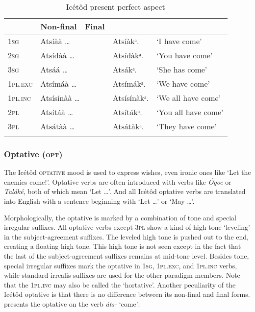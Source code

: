 \begin{table}
\caption{Icétôd present perfect aspect}
\label{tab:verbs:perf}


\begin{tabularx}{\textwidth}{XXXXl}
\lsptoprule

\multicolumn{2}{X}{} & Non-final & Final & \\
\midrule
\textsc{1sg} & \multicolumn{2}{X}{Atsíàà {\dots}} & Atsíàkᵃ. & ‘I have come’\\
\textsc{2sg} & \multicolumn{2}{X}{Atsídàà {\dots}} & Atsídàkᵃ. & ‘You have come’\\
\textsc{3sg} & \multicolumn{2}{X}{Atsáá {\dots}} & Atsákᵃ. & ‘She has come’\\
\textsc{1pl.exc} & \multicolumn{2}{X}{Atsímáà {\dots}} & Atsímákᵃ. & ‘We have come’\\
\textsc{1pl.inc} & \multicolumn{2}{X}{Atsísínàà {\dots}} & Atsísínàkᵃ. & ‘We all have come’\\
\textsc{2pl} & \multicolumn{2}{X}{Atsítáà {\dots}} & Atsítákᵃ. & ‘You all have come’\\
\textsc{3pl} & \multicolumn{2}{X}{Atsátàà {\dots}} & Atsátàkᵃ. & ‘They have come’\\
\lspbottomrule
\end{tabularx}
\end{table}

\subsubsection{Optative (\textsc{opt})}\label{sec:8.10.3}

The Icétôd \textsc{optative} mood is used to express wishes, even ironic ones like ‘Let the enemies comeǃ’. Optative verbs are often introduced with  verbs like \textit{\'{O}goe} or \textit{Taláké}, both of which mean ‘Let {\dots}’. And all Icétôd optative verbs are translated into English with a sentence beginning with ‘Let {\dots}’ or ‘May {\dots}’. 

Morphologically, the optative is marked by a combination of tone and special irregular suffixes. All optative verbs except 3\textsc{pl} show a kind of high-tone ‘leveling’ in the subject-agreement suffixes. The leveled high tone is pushed out to the end, creating a floating high tone. This high tone is not seen except in the fact that the last  of the subject-agreement suffixes remains at mid-tone level. Besides tone, special irregular suffixes mark the optative in \textsc{1sg}, 1\textsc{pl.exc}, and 1\textsc{pl.inc} verbs, while standard irrealis suffixes are used for the other paradigm members. Note that the 1\textsc{pl.inc} may also be called the ‘hortative’. Another peculiarity of the Icétôd optative is that there is no difference between its non-final and final forms.  presents the optative on the verb \textit{àts-} ‘come’:


